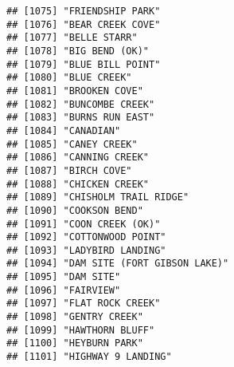 \documentclass[
]{article}
\begin{document}
\begin{verbatim}
## [1075] "FRIENDSHIP PARK"                                                                     
## [1076] "BEAR CREEK COVE"                                                                     
## [1077] "BELLE STARR"                                                                         
## [1078] "BIG BEND (OK)"                                                                       
## [1079] "BLUE BILL POINT"                                                                     
## [1080] "BLUE CREEK"                                                                          
## [1081] "BROOKEN COVE"                                                                        
## [1082] "BUNCOMBE CREEK"                                                                      
## [1083] "BURNS RUN EAST"                                                                      
## [1084] "CANADIAN"                                                                            
## [1085] "CANEY CREEK"                                                                         
## [1086] "CANNING CREEK"                                                                       
## [1087] "BIRCH COVE"                                                                          
## [1088] "CHICKEN CREEK"                                                                       
## [1089] "CHISHOLM TRAIL RIDGE"                                                                
## [1090] "COOKSON BEND"                                                                        
## [1091] "COON CREEK (OK)"                                                                     
## [1092] "COTTONWOOD POINT"                                                                    
## [1093] "LADYBIRD LANDING"                                                                    
## [1094] "DAM SITE (FORT GIBSON LAKE)"                                                         
## [1095] "DAM SITE"                                                                            
## [1096] "FAIRVIEW"                                                                            
## [1097] "FLAT ROCK CREEK"                                                                     
## [1098] "GENTRY CREEK"                                                                        
## [1099] "HAWTHORN BLUFF"                                                                      
## [1100] "HEYBURN PARK"                                                                        
## [1101] "HIGHWAY 9 LANDING"                                                                   

\end{verbatim}
\end{document}
